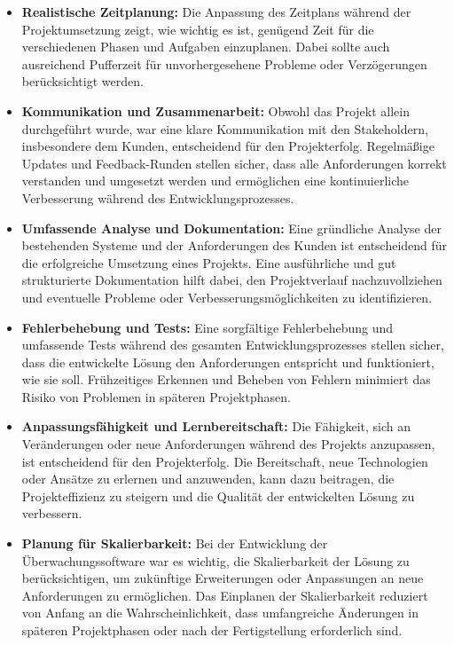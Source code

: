 \begin{flushleft}
			\begin{itemize} \item \textbf{Realistische Zeitplanung:} Die Anpassung des Zeitplans während der Projektumsetzung zeigt, wie wichtig es ist, genügend Zeit für die verschiedenen Phasen und Aufgaben einzuplanen. Dabei sollte auch ausreichend Pufferzeit für unvorhergesehene Probleme oder Verzögerungen berücksichtigt werden.
				\item \textbf{Kommunikation und Zusammenarbeit:} Obwohl das Projekt allein durchgeführt wurde, war eine klare Kommunikation mit den Stakeholdern, insbesondere dem Kunden, entscheidend für den Projekterfolg. Regelmäßige Updates und Feedback-Runden stellen sicher, dass alle Anforderungen korrekt verstanden und umgesetzt werden und ermöglichen eine kontinuierliche Verbesserung während des Entwicklungsprozesses.
				\item \textbf{Umfassende Analyse und Dokumentation:} Eine gründliche Analyse der bestehenden Systeme und der Anforderungen des Kunden ist entscheidend für die erfolgreiche Umsetzung eines Projekts. Eine ausführliche und gut strukturierte Dokumentation hilft dabei, den Projektverlauf nachzuvollziehen und eventuelle Probleme oder Verbesserungsmöglichkeiten zu identifizieren.
				\item \textbf{Fehlerbehebung und Tests:} Eine sorgfältige Fehlerbehebung und umfassende Tests während des gesamten Entwicklungsprozesses stellen sicher, dass die entwickelte Lösung den Anforderungen entspricht und funktioniert, wie sie soll. Frühzeitiges Erkennen und Beheben von Fehlern minimiert das Risiko von Problemen in späteren Projektphasen.
				\item \textbf{Anpassungsfähigkeit und Lernbereitschaft:} Die Fähigkeit, sich an Veränderungen oder neue Anforderungen während des Projekts anzupassen, ist entscheidend für den Projekterfolg. Die Bereitschaft, neue Technologien oder Ansätze zu erlernen und anzuwenden, kann dazu beitragen, die Projekteffizienz zu steigern und die Qualität der entwickelten Lösung zu verbessern.
				\item \textbf{Planung für Skalierbarkeit:} Bei der Entwicklung der Überwachungssoftware war es wichtig, die Skalierbarkeit der Lösung zu berücksichtigen, um zukünftige Erweiterungen oder Anpassungen an neue Anforderungen zu ermöglichen. Das Einplanen der Skalierbarkeit reduziert von Anfang an die Wahrscheinlichkeit, dass umfangreiche Änderungen in späteren Projektphasen oder nach der Fertigstellung erforderlich sind.
			\end{itemize}


\end{flushleft}
